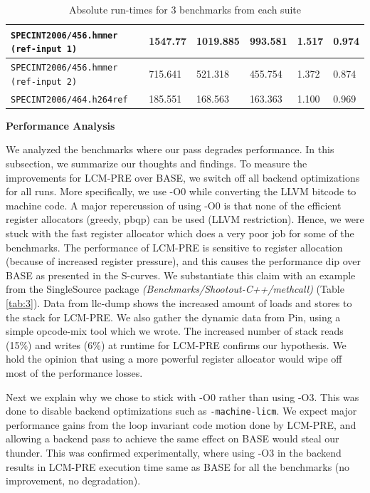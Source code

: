 \documentclass[10pt,twoside]{report}
\begin{document}
\begin{table}
{\begin{tabular}{|l|l|l|l|l|l|}
  \texttt{SPECINT2006/456.hmmer (ref-input 1)}                         & 1547.77     & 1019.885  & 993.581      & 1.517 & 0.974 \\ \hline
  \texttt{SPECINT2006/456.hmmer (ref-input 2)}                         &  715.641    &  521.318  & 455.754      & 1.372   & 0.874   \\ \hline
  \texttt{SPECINT2006/464.h264ref}                       & 185.551     & 168.563   & 163.363      & 1.100 & 0.969 \\ \hline
  \end{tabular}
}
\caption{Absolute run-times for $3$ benchmarks from each suite} \label{tab:2}
    \end{table}

\newpage
\begin{flushleft}
\textbf{\large{{Performance Analysis }}}
\end{flushleft} 
We analyzed the benchmarks where our pass degrades performance. In this
subsection, we summarize our thoughts and findings. To measure the improvements
for LCM-PRE over BASE, we switch off all backend optimizations for all runs.
More specifically, we use -O$0$ while converting the LLVM bitcode to machine
code. A major repercussion of using -O$0$ is that none of the efficient register
allocators (greedy, pbqp) can be used (LLVM restriction). Hence, we were
stuck with the fast register allocator which does a very poor job for some of
the benchmarks. The performance of LCM-PRE is sensitive to register allocation
(because of increased register pressure), and this causes the performance dip
over BASE as presented in the S-curves. We substantiate this claim with an
example from the SingleSource package \emph{(Benchmarks/Shootout-C++/methcall)} (Table
    \ref{tab:3}). Data from llc-dump shows the increased amount of loads and
stores to the stack for LCM-PRE. We also gather the dynamic data from Pin,
       using a simple opcode-mix tool which we wrote. The increased number of
       stack reads (15\%) and writes (6\%) at runtime for LCM-PRE confirms our
       hypothesis. We hold the opinion that using a more powerful register
       allocator would wipe off most of the performance losses. 

Next we explain why we chose to stick with -O$0$ rather than using -O$3$. This was
done to disable backend optimizations such as \texttt{-machine-licm}. We expect major
performance gains from the loop invariant code motion done by LCM-PRE, and
allowing a backend pass to achieve the same effect on BASE would steal our
thunder. This was confirmed experimentally, where using -O$3$ in the backend
results in LCM-PRE execution time same as BASE for all the benchmarks (no
    improvement, no degradation).
\end{document}
